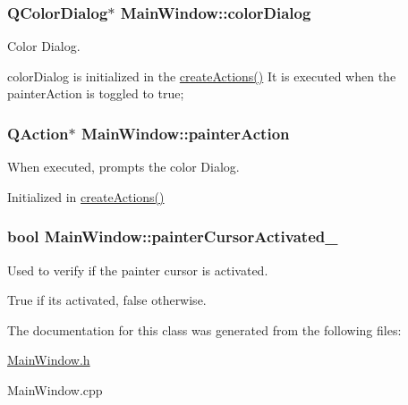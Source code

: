 \subsubsection[{color\+Dialog}]{\setlength{\rightskip}{0pt plus 5cm}Q\+Color\+Dialog$\ast$ Main\+Window\+::color\+Dialog\hspace{0.3cm}{\ttfamily [private]}}\label{class_main_window_a840d28fd8f004fd5a1ea97dd7cbe7e50}


Color Dialog. 

color\+Dialog is initialized in the \hyperlink{class_main_window_a62cd8712fb41a754298f6f60eead2cb0}{create\+Actions()} It is executed when the painter\+Action is toggled to true; \hypertarget{class_main_window_a95374ee491dceb4ee57e27afff60d56b}{}
\subsubsection[{painter\+Action}]{\setlength{\rightskip}{0pt plus 5cm}Q\+Action$\ast$ Main\+Window\+::painter\+Action\hspace{0.3cm}{\ttfamily [private]}}\label{class_main_window_a95374ee491dceb4ee57e27afff60d56b}


When executed, prompts the color Dialog. 

Initialized in \hyperlink{class_main_window_a62cd8712fb41a754298f6f60eead2cb0}{create\+Actions()} \hypertarget{class_main_window_a09dfa34e541dff8ab1e4f29bfca76169}{}
\subsubsection[{painter\+Cursor\+Activated\+\_\+}]{\setlength{\rightskip}{0pt plus 5cm}bool Main\+Window\+::painter\+Cursor\+Activated\+\_\+\hspace{0.3cm}{\ttfamily [private]}}\label{class_main_window_a09dfa34e541dff8ab1e4f29bfca76169}


Used to verify if the painter cursor is activated. 

True if its activated, false otherwise. 

The documentation for this class was generated from the following files\+:\begin{DoxyCompactItemize}
\item 
\hyperlink{_main_window_8h}{Main\+Window.\+h}\item 
Main\+Window.\+cpp\end{DoxyCompactItemize}
